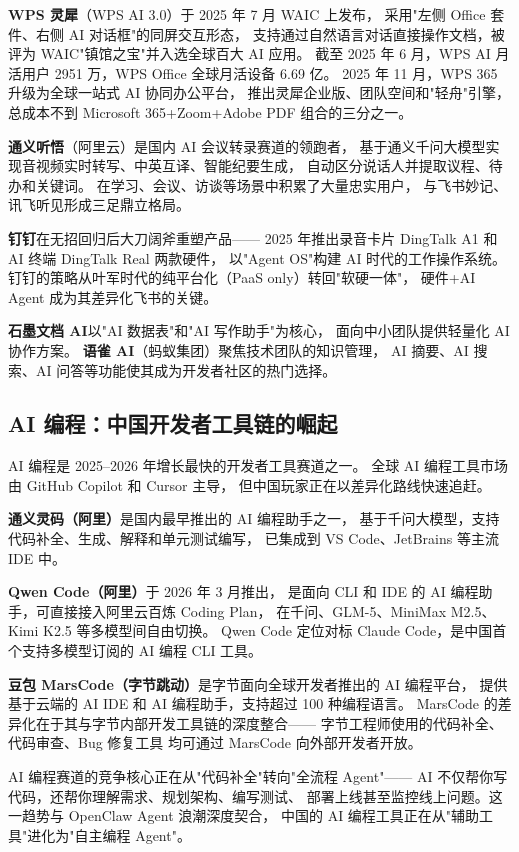 \textbf{WPS 灵犀}（WPS AI 3.0）于 2025 年 7 月 WAIC 上发布，
采用"左侧 Office 套件、右侧 AI 对话框"的同屏交互形态，
支持通过自然语言对话直接操作文档，被评为 WAIC"镇馆之宝"并入选全球百大 AI 应用。
截至 2025 年 6 月，WPS AI 月活用户 2951 万，WPS Office 全球月活设备 6.69 亿。
2025 年 11 月，WPS 365 升级为全球一站式 AI 协同办公平台，
推出灵犀企业版、团队空间和"轻舟"引擎，
总成本不到 Microsoft 365+Zoom+Adobe PDF 组合的三分之一。

\textbf{通义听悟}（阿里云）是国内 AI 会议转录赛道的领跑者，
基于通义千问大模型实现音视频实时转写、中英互译、智能纪要生成，
自动区分说话人并提取议程、待办和关键词。
在学习、会议、访谈等场景中积累了大量忠实用户，
与飞书妙记、讯飞听见形成三足鼎立格局。

\textbf{钉钉}在无招回归后大刀阔斧重塑产品——
2025 年推出录音卡片 DingTalk A1 和 AI 终端 DingTalk Real 两款硬件，
以"Agent OS"构建 AI 时代的工作操作系统。
钉钉的策略从叶军时代的纯平台化（PaaS only）转回"软硬一体"，
硬件+AI Agent 成为其差异化飞书的关键。

\textbf{石墨文档 AI}以"AI 数据表"和"AI 写作助手"为核心，
面向中小团队提供轻量化 AI 协作方案。
\textbf{语雀 AI}（蚂蚁集团）聚焦技术团队的知识管理，
AI 摘要、AI 搜索、AI 问答等功能使其成为开发者社区的热门选择。

\subsection{AI 编程：中国开发者工具链的崛起}
\label{subsec:china-ai-coding}

AI 编程是 2025--2026 年增长最快的开发者工具赛道之一。
全球 AI 编程工具市场由 GitHub Copilot 和 Cursor 主导，
但中国玩家正在以差异化路线快速追赶。

\textbf{通义灵码（阿里）}是国内最早推出的 AI 编程助手之一，
基于千问大模型，支持代码补全、生成、解释和单元测试编写，
已集成到 VS Code、JetBrains 等主流 IDE 中。

\textbf{Qwen Code（阿里）}于 2026 年 3 月推出，
是面向 CLI 和 IDE 的 AI 编程助手，可直接接入阿里云百炼 Coding Plan，
在千问、GLM-5、MiniMax M2.5、Kimi K2.5 等多模型间自由切换。
Qwen Code 定位对标 Claude Code，是中国首个支持多模型订阅的 AI 编程 CLI 工具。

\textbf{豆包 MarsCode（字节跳动）}是字节面向全球开发者推出的 AI 编程平台，
提供基于云端的 AI IDE 和 AI 编程助手，支持超过 100 种编程语言。
MarsCode 的差异化在于其与字节内部开发工具链的深度整合——
字节工程师使用的代码补全、代码审查、Bug 修复工具
均可通过 MarsCode 向外部开发者开放。

AI 编程赛道的竞争核心正在从"代码补全"转向"全流程 Agent"——
AI 不仅帮你写代码，还帮你理解需求、规划架构、编写测试、
部署上线甚至监控线上问题。这一趋势与 OpenClaw Agent 浪潮深度契合，
中国的 AI 编程工具正在从"辅助工具"进化为"自主编程 Agent"。

